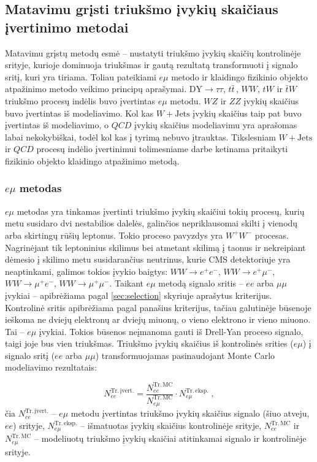 \documentclass[a4paper, 12pt, oneside]{article}
\newcommand{\ZZ}{Z\! Z}
\newcommand{\WZ}{W\! Z}
\newcommand{\emu}{e\mu}
\newcommand{\WJets}{W\! +\!\mathrm{Jets}}
\newcommand{\DYtau}{\mathrm{DY} \! \rightarrow \! \tau\tau}
\newcommand{\QCD}{QC\! D}
\newlength\q
\begin{document}
\subsection{Matavimu grįsti triukšmo įvykių skaičiaus įvertinimo metodai}
Matavimu grįstų metodų esmė -- nustatyti triukšmo įvykių skaičių kontrolinėje srityje, kurioje dominuoja triukšmas
ir gautą rezultatą transformuoti į signalo sritį, kuri yra tiriama.
Toliau pateikiami $\emu$ metodo ir klaidingo fizikinio objekto atpažinimo metodo veikimo principų aprašymai.
$\DYtau$, $t\bar{t}\,$, $WW$, $tW$ ir $\bar{t}W$ triukšmo procesų indėlis buvo įvertintas $\emu$ metodu.
$\WZ$ ir $\ZZ$ įvykių skaičius buvo įvertintas iš modeliavimo.
Kol kas $\WJets$ įvykių skaičius taip pat buvo įvertintas iš modeliavimo, o $\QCD$ įvykių skaičius modeliavimu yra
aprašomas labai nekokybiškai, todėl kol kas į tyrimą nebuvo įtrauktas.
Tikslesniam $\WJets$ ir $\QCD$ procesų indėlio įvertinimui tolimesniame darbe ketinama pritaikyti fizikinio objekto klaidingo
atpažinimo metodą.

\subsubsection{$\emu$ metodas}\label{sec:SignalBkg}

$\emu$ metodas yra tinkamas įvertinti triukšmo įvykių skaičiui tokių procesų, kurių metu susidaro dvi
nestabilios dalelės, galinčios nepriklausomai skilti į vienodų arba skirtingų rūšių leptonus.
Tokio proceso pavyzdys yra $W^{\!+}\!W^{\!-}$ procesas.
Nagrinėjant tik leptoninius skilimus bei atmetant skilimą į taonus ir nekreipiant dėmesio į skilimo metu
susidarančius neutrinus, kurie CMS detektoriuje yra neaptinkami,
galimos tokios įvykio baigtys: $WW\!\!\rightarrow\! e^{\!+}\! e^{\!-}$, $WW\!\!\rightarrow\! e^{\!+}\!\mu^{\!-}$,
$WW\!\!\rightarrow\! \mu^{\!+}\!e^{\!-}$, $WW\!\!\rightarrow\! \mu^{\!+}\!\mu^{\!-}$.
Taikant $\emu$ metodą signalo sritis -- $ee$ arba $\mu\mu$ įvykiai -- apibrėžiama pagal \ref{sec:selection} skyriuje
aprašytus kriterijus.
Kontrolinė sritis apibrėžiama pagal panašius kriterijus, tačiau galutinėje būsenoje ieškoma
ne dviejų elektronų ar dviejų miuonų, o vieno elektrono ir vieno miuono.
Tai -- $\emu$ įvykiai.
Tokios būsenos neįmanoma gauti iš Drell-Yan proceso signalo, taigi joje bus vien triukšmas.
Triukšmo įvykių skaičius iš kontrolinės srities ($\emu$) į signalo sritį ($ee$ arba $\mu\mu$)
transformuojamas pasinaudojant Monte Carlo modeliavimo rezultatais:

\begin{equation}
	N_{ee}^{\mathrm{Tr. \, įvert.}} =
	\frac{ N_{ee}^{\mathrm{Tr. \, MC}} }{ N_{e\mu}^{\mathrm{Tr. \, MC}} }
	\cdot N_{e\mu}^{\mathrm{Tr. \, eksp.}} \; ,
	\label{eq:emuMethod}
\end{equation}
čia $N_{ee}^{\mathrm{Tr. \, įvert.}}$ -- $\emu$ metodu įvertintas triukšmo įvykių skaičius signalo
(šiuo atveju, $ee$) srityje, $N_{e\mu}^{\mathrm{Tr. \, eksp.}}$ -- išmatuotas įvykių skaičius
kontrolinėje srityje, $N_{ee}^{\mathrm{Tr. \, MC}}$ ir $N_{e\mu}^{\mathrm{Tr. \, MC}}$ -- modeliuotų
triukšmo įvykių skaičiai atitinkamai signalo ir kontrolinėje srityje.
\end{document}
